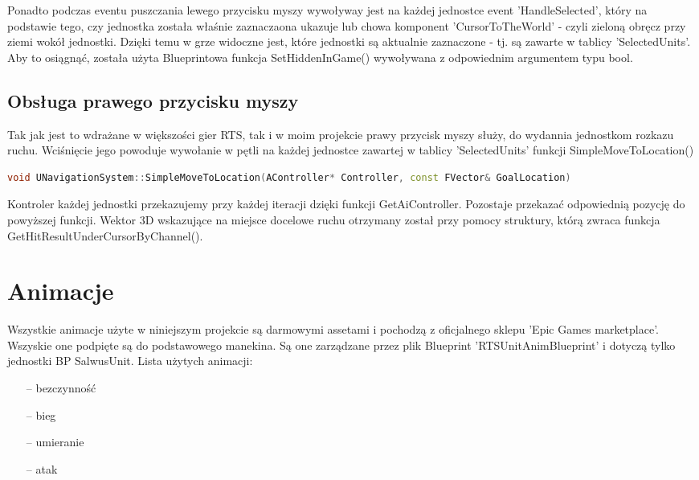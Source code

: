 \documentclass[12pt]{report}
\begin{document}
Ponadto podczas eventu puszczania lewego przycisku myszy wywoływay jest na każdej jednostce event 'HandleSelected', który na podstawie tego, czy jednostka została właśnie zaznaczaona ukazuje lub chowa komponent 'CursorToTheWorld' - czyli zieloną obręcz przy ziemi wokół jednostki. Dzięki temu w grze widoczne jest, które jednostki są aktualnie zaznaczone - tj. są zawarte w tablicy 'SelectedUnits'. Aby to osiągnąć, została użyta Blueprintowa funkcja SetHiddenInGame() wywoływana z odpowiednim argumentem typu bool.

\subsection{Obsługa prawego przycisku myszy}
Tak jak jest to wdrażane w większości gier RTS, tak i w moim projekcie prawy przycisk myszy służy, do wydannia jednostkom rozkazu ruchu. Wciśnięcie jego powoduje wywołanie w pętli na każdej jednostce zawartej w tablicy 'SelectedUnits' funkcji SimpleMoveToLocation()

\begin{lstlisting}[language=C++, backgroundcolor=\color{black!5}, basicstyle=\footnotesize, caption=Funkcja SimpleMoveToLocation() w klasie UNavigationSystem.]
void UNavigationSystem::SimpleMoveToLocation(AController* Controller, const FVector& GoalLocation)
\end{lstlisting}
Kontroler każdej jednostki przekazujemy przy każdej iteracji dzięki funkcji GetAiController. Pozostaje przekazać odpowiednią pozycję do powyższej funkcji. Wektor 3D wskazujące na miejsce docelowe ruchu otrzymany został przy pomocy struktury, którą zwraca funkcja GetHitResultUnderCursorByChannel(). 

\section{Animacje}
Wszystkie animacje użyte w niniejszym projekcie są darmowymi assetami i pochodzą z oficjalnego sklepu 'Epic Games marketplace'. Wszyskie one podpięte są do podstawowego manekina. Są one zarządzane przez plik Blueprint 'RTSUnitAnimBlueprint' i dotyczą tylko jednostki BP SalwusUnit. Lista użytych animacji:
\begin{itemize}
\item[--] bezczynność 
\item[--] bieg
\item[--] umieranie 
\item[--] atak 
\end{itemize}
\end{document}
